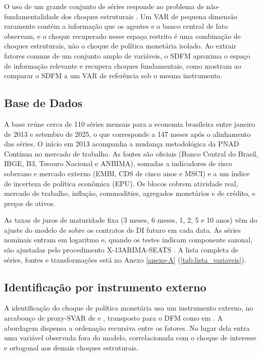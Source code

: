 \documentclass[
article,			%
12pt,				%
oneside,			%
a4paper,			%
hidelinks, 
english,			%
brazil,				%
]{abntex2}
\theoremstyle{plain}
\theoremstyle{definition}
\theoremstyle{remark}
\begin{document}
O uso de um grande conjunto de séries responde ao problema de não-fundamentalidade dos choques estruturais \cite{villaverde}. Um VAR de pequena dimensão raramente contém a informação que os agentes e o banco central de fato observam, e o choque recuperado nesse espaço restrito é uma combinação de choques estruturais, não o choque de política monetária isolado. Ao extrair fatores comuns de um conjunto amplo de variáveis, o SDFM aproxima o espaço de informação relevante e recupera choques fundamentais, como mostram  ao comparar o SDFM a um VAR de referência sob o mesmo instrumento.

\subsection{Base de Dados}

A base reúne cerca de 110 séries mensais para a economia brasileira entre janeiro de 2013 e setembro de 2025, o que corresponde a 147 meses após o alinhamento das séries. O início em 2013 acompanha a mudança metodológica da PNAD Contínua no mercado de trabalho. As fontes são oficiais (Banco Central do Brasil, IBGE, B3, Tesouro Nacional e ANBIMA), somadas a indicadores de risco soberano e mercado externo (EMBI, CDS de cinco anos e MSCI) e a um índice de incerteza de política econômica (EPU). Os blocos cobrem atividade real, mercado de trabalho, inflação, commodities, agregados monetários e de crédito, e preços de ativos.

As taxas de juros de maturidade fixa (3 meses, 6 meses, 1, 2, 5 e 10 anos) vêm do ajuste do modelo de  sobre os contratos de DI futuro em cada data. As séries nominais entram em logaritmo e, quando os testes indicam componente sazonal, são ajustadas pelo procedimento X-13ARIMA-SEATS \cite{sax2018seasonal}. A lista completa de séries, fontes e transformações está no Anexo \ref{anexo-A} (\autoref{tab:lista_variaveis}).

\subsection{Identificação por instrumento externo}

A identificação do choque de política monetária usa um instrumento externo, no arcabouço de proxy-SVAR de  e , transposto para o DFM como em . A abordagem dispensa a ordenação recursiva entre os fatores. No lugar dela entra uma variável observada fora do modelo, correlacionada com o choque de interesse e ortogonal aos demais choques estruturais.
\end{document}
